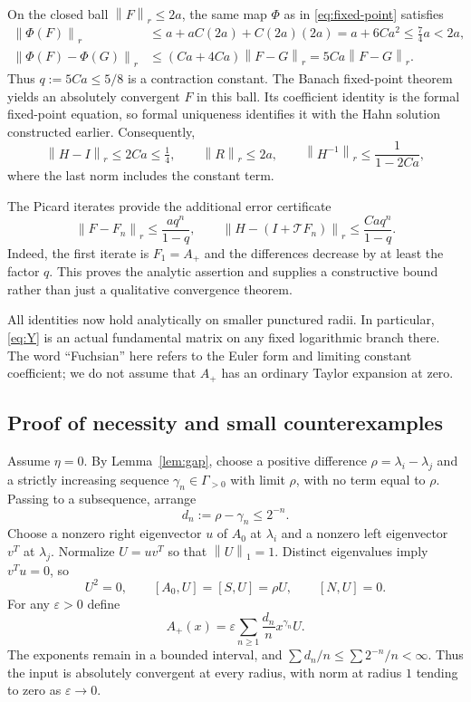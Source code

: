 \documentclass[11pt,a4paper]{article}
\numberwithin{equation}{section}
\theoremstyle{definition}
\theoremstyle{remark}
\newcommand{\G}{\Gamma}
\newcommand{\norm}[1]{\left\lVert #1\right\rVert}
\newcommand{\Aplus}{A_{+}}
\newcommand{\Th}{\mathcal T}
\begin{document}
On the closed ball $\norm F_r\leq2a$, the same map $\Phi$ as in
\eqref{eq:fixed-point} satisfies
\begin{align*}
 \norm{\Phi(F)}_r
 &\leq a+aC(2a)+C(2a)(2a)
 =a+6Ca^2\leq\tfrac74a<2a,\\
 \norm{\Phi(F)-\Phi(G)}_r
 &\leq(Ca+4Ca)\norm{F-G}_r
 =5Ca\norm{F-G}_r.
\end{align*}
Thus $q:=5Ca\leq5/8$ is a contraction constant. The Banach fixed-point
theorem yields an absolutely convergent $F$ in this ball. Its coefficient
identity is the formal fixed-point equation, so formal uniqueness identifies
it with the Hahn solution constructed earlier. Consequently,
\begin{equation}\label{eq:analytic-estimates}
 \norm{H-I}_r\leq2Ca\leq\tfrac14,
 \qquad\norm R_r\leq2a,
 \qquad\norm{H^{-1}}_r\leq\frac1{1-2Ca},
\end{equation}
where the last norm includes the constant term.

The Picard iterates provide the additional error certificate
\begin{equation}\label{eq:picard-bound}
 \norm{F-F_n}_r\leq\frac{a q^n}{1-q},\qquad
 \norm{H-(I+\Th F_n)}_r\leq\frac{Ca q^n}{1-q}.
\end{equation}
Indeed, the first iterate is $F_1=\Aplus$ and the differences decrease by
at least the factor $q$. This proves the analytic assertion and supplies a
constructive bound rather than just a qualitative convergence theorem.

All identities now hold analytically on smaller punctured radii. In
particular, \eqref{eq:Y} is an actual fundamental matrix on any fixed
logarithmic branch there. The word ``Fuchsian'' here refers to the Euler
form and limiting constant coefficient; we do not assume that
$\Aplus$ has an ordinary Taylor expansion at zero.

\subsection{Proof of necessity and small counterexamples}
Assume $\eta=0$. By Lemma~\ref{lem:gap}, choose a positive difference
$\rho=\lambda_i-\lambda_j$ and a strictly increasing sequence
$\gamma_n\in\G_{>0}$ with limit $\rho$, with no term equal to
$\rho$. Passing to a subsequence, arrange
\begin{equation}\label{eq:dn}
 d_n:=\rho-\gamma_n\leq2^{-n}.
\end{equation}
Choose a nonzero right eigenvector $u$ of $A_0$ at $\lambda_i$ and a
nonzero left eigenvector $v^T$ at $\lambda_j$. Normalize
$U=uv^T$ so that $\norm U_1=1$. Distinct eigenvalues imply $v^Tu=0$,
so
\begin{equation}\label{eq:rank-one}
 U^2=0,\qquad [A_0,U]=[S,U]=\rho U,\qquad[N,U]=0.
\end{equation}
For any $\varepsilon>0$ define
\begin{equation}\label{eq:counter-general}
 \Aplus(x)=\varepsilon\sum_{n\geq1}\frac{d_n}{n}x^{\gamma_n}U.
\end{equation}
The exponents remain in a bounded interval, and
$\sum d_n/n\leq\sum2^{-n}/n<\infty$. Thus the input is absolutely
convergent at every radius, with norm at radius $1$ tending to zero as
$\varepsilon\to0$.
\end{document}
